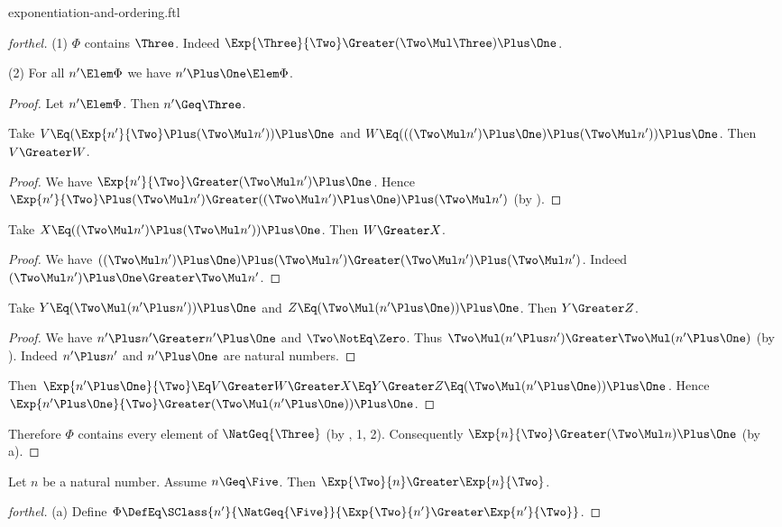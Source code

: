 \documentclass{stex}
\begin{document}
\begin{smodule}{exponentiation-and-ordering.ftl}
\begin{proof}[forthel]
  (1) $\Phi$ contains $\Three$.
  Indeed $\Exp{\Three}{\Two} \Greater (\Two \Mul \Three) \Plus \One$.

  (2) For all $n' \Elem \Phi$ we have $n' \Plus \One \Elem \Phi$.
  \begin{proof}
    Let $n' \Elem \Phi$.
    Then $n' \Geq \Three$.

    Take $V \Eq (\Exp{n'}{\Two} \Plus (\Two \Mul n')) \Plus \One$ and $W \Eq (((\Two \Mul n') \Plus \One) \Plus (\Two \Mul n')) \Plus \One$.
    Then $V \Greater W$.
    \begin{proof}
      We have $\Exp{n'}{\Two} \Greater (\Two \Mul n') \Plus \One$.
      Hence $\Exp{n'}{\Two} \Plus (\Two \Mul n') \Greater ((\Two \Mul n') \Plus \One) \Plus (\Two \Mul n')$ (by ).
    \end{proof}

    Take $X \Eq ((\Two \Mul n') \Plus (\Two \Mul n')) \Plus \One$.
    Then $W \Greater X$.
    \begin{proof}
      We have $((\Two \Mul n') \Plus \One) \Plus (\Two \Mul n') \Greater (\Two \Mul n') \Plus (\Two \Mul n')$.
      Indeed $(\Two \Mul n') \Plus \One \Greater \Two \Mul n'$.
    \end{proof}

    Take $Y \Eq (\Two \Mul (n' \Plus n')) \Plus \One$ and $Z \Eq (\Two \Mul (n' \Plus \One)) \Plus \One$.
    Then $Y \Greater Z$.
    \begin{proof}
      We have $n' \Plus n' \Greater n' \Plus \One$ and $\Two \NotEq \Zero$.
      Thus $\Two \Mul (n' \Plus n') \Greater \Two \Mul (n' \Plus \One)$ (by ).
      Indeed $n' \Plus n'$ and $n' \Plus \One$ are natural numbers.
    \end{proof}

    Then $\Exp{n' \Plus \One}{\Two} \Eq V \Greater W \Greater X \Eq Y \Greater Z \Eq (\Two \Mul (n' \Plus \One)) \Plus \One$.
    Hence $\Exp{n' \Plus \One}{\Two} \Greater (\Two \Mul (n' \Plus \One)) \Plus \One$.
  \end{proof}

  Therefore $\Phi$ contains every element of $\NatGeq{\Three}$ (by , 1, 2).
  Consequently $\Exp{n}{\Two} \Greater (\Two \Mul n) \Plus \One$ (by a).
\end{proof}

\begin{proposition*}[forthel]
  Let $n$ be a natural number.
  Assume $n \Geq \Five$.
  Then $\Exp{\Two}{n} \Greater \Exp{n}{\Two}$.
\end{proposition*}
\begin{proof}[forthel]
  (a) Define $\Phi \DefEq \SClass{n'}{\NatGeq{\Five}}{\Exp{\Two}{n'} \Greater \Exp{n'}{\Two}}$.


\end{proof}
\end{smodule}
\end{document}
